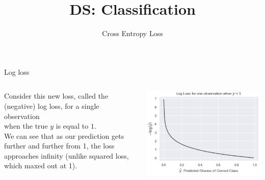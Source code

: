 \documentclass[aspectratio=169]{../latex_main/tntbeamer}  %
\title[Cross Entropy Loss]{DS: Classification}
\subtitle{Cross Entropy Loss}
\begin{document}
	
	\maketitle
	\begin{frame}{Log loss}
	    \begin{columns}
	        \begin{column}{.5\textwidth}
	                Consider this new loss, called the (negative) log loss, for a single observation\\ \alert{when the true $y$ is equal to $1$.}\\
	                \bigskip
	                We can see that as our prediction gets further and further from 1, the loss approaches infinity (unlike squared loss, which maxed out at 1).
	        \end{column}
	        
	        \begin{column}{.4\textwidth}
	                    
	                    \centering
	                    \includegraphics[scale=.5]{Bild18}
	        \end{column}
	    \end{columns}
	\end{frame}
	
	
	
	
\end{document}
